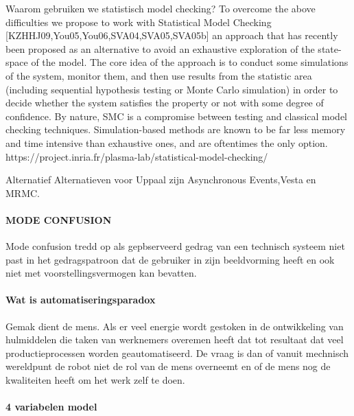 \cite{inriaStatsMoodCheck}
\cite{ buddeModelChecker}
\cite{AGHASuervey }


Waarom gebruiken we statistisch model checking?
To overcome the above difficulties we propose to work with Statistical Model Checking [KZHHJ09,You05,You06,SVA04,SVA05,SVA05b] an approach that has recently been proposed as an alternative to avoid an exhaustive exploration of the state-space of the model. The core idea of the approach is to conduct some simulations of the system, monitor them, and then use results from the statistic area (including sequential hypothesis testing or Monte Carlo simulation) in order to decide whether the system satisfies the property or not with some degree of confidence. By nature, SMC is a compromise between testing and classical model checking techniques. Simulation-based methods are known to be far less memory and time intensive than exhaustive ones, and are oftentimes the only option. 
https://project.inria.fr/plasma-lab/statistical-model-checking/

Alternatief
Alternatieven voor Uppaal zijn Asynchronous Events,Vesta en MRMC.


\paragraph{MODE CONFUSION }
Mode confusion tredd op als gepbserveerd gedrag van een technisch systeem niet past in het gedragspatroon dat de gebruiker in zijn beeldvorming heeft  en ook niet met voorstellingsvermogen kan bevatten.
\paragraph{Wat is automatiseringsparadox}
Gemak dient de mens. Als er veel energie wordt gestoken in de ontwikkeling van hulmiddelen die taken van werknemers overemen heeft dat tot resultaat dat veel productieprocessen worden geautomatiseerd. De vraag is dan of vanuit mechnisch wereldpunt de robot niet de rol van de mens overneemt en of de mens nog de kwaliteiten heeft om het werk zelf te doen.
\cite{bicker21102016automatiseringsparadox }
\cite{vseautoparadox }
\cite{blogxot21112016slimapparaat }



\paragraph{4 variabelen model}





